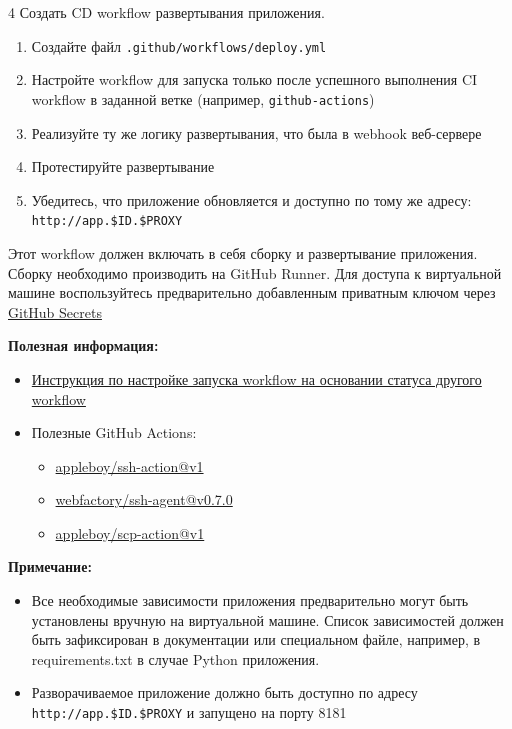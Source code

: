 \documentclass[12pt,a4paper]{article}
\begin{document}
\begin{task}{4}
    Создать CD workflow развертывания приложения.

    \begin{enumerate}
        \item Создайте файл \texttt{.github/workflows/deploy.yml}
        \item Настройте workflow для запуска только после успешного выполнения CI workflow в заданной ветке (например, \texttt{github-actions})
        \item Реализуйте ту же логику развертывания, что была в webhook веб-сервере
        \item Протестируйте развертывание
        \item Убедитесь, что приложение обновляется и доступно по тому же адресу: \texttt{http://app.\$ID.\$PROXY}
    \end{enumerate}

    Этот workflow должен включать в себя сборку и развертывание приложения.
    Сборку необходимо производить на GitHub Runner.
    Для доступа к виртуальной машине воспользуйтесь предварительно добавленным приватным ключом через \href{https://docs.github.com/ru/actions/how-tos/write-workflows/choose-what-workflows-do/use-secrets}{GitHub Secrets}

    \textbf{Полезная информация:}
    \begin{itemize}
        \item \href{https://docs.github.com/en/actions/reference/workflows-and-actions/events-that-trigger-workflows#workflow_run}{Инструкция по настройке запуска workflow на основании статуса другого workflow}
        \item Полезные GitHub Actions:
        \begin{itemize}
            \item \href{https://github.com/appleboy/ssh-action}{appleboy/ssh-action@v1}
            \item \href{https://github.com/webfactory/ssh-agent}{webfactory/ssh-agent@v0.7.0}
            \item \href{https://github.com/appleboy/scp-action}{appleboy/scp-action@v1}
        \end{itemize}
    \end{itemize}
    
    \textbf{Примечание:}
    \begin{itemize}
        \item Все необходимые зависимости приложения предварительно могут быть установлены вручную на виртуальной машине.
        Список зависимостей должен быть зафиксирован в документации или специальном файле, например, в requirements.txt в случае Python приложения.
        \item Разворачиваемое приложение должно быть доступно по адресу \texttt{http://app.\$ID.\$PROXY} и запущено на порту 8181
    \end{itemize}
\end{task}
\end{document}
